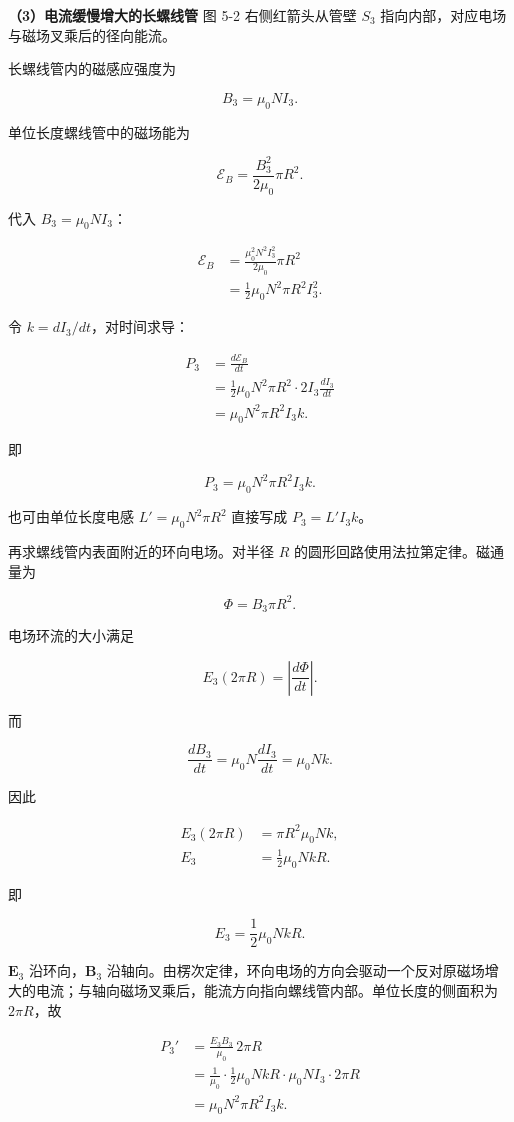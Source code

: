 \documentclass[12pt,a4paper,UTF8]{ctexart}
\begin{document}
\textbf{（3）电流缓慢增大的长螺线管} 图 5-2 右侧红箭头从管壁 \(S_3\)
指向内部，对应电场与磁场叉乘后的径向能流。

长螺线管内的磁感应强度为

\[\boxed{B_3=\mu_0NI_3}.\]

单位长度螺线管中的磁场能为

\[\mathcal E_B
=\frac{B_3^2}{2\mu_0}\pi R^2.\]

代入 \(B_3=\mu_0NI_3\)：

\[\begin{aligned}
\mathcal E_B
&=\frac{\mu_0^2N^2I_3^2}{2\mu_0}\pi R^2\\
&=\frac12\mu_0N^2\pi R^2I_3^2.
\end{aligned}\]

令 \(k=dI_3/dt\)，对时间求导：

\[\begin{aligned}
P_3
&=\frac{d\mathcal E_B}{dt}\\
&=\frac12\mu_0N^2\pi R^2\cdot2I_3\frac{dI_3}{dt}\\
&=\mu_0N^2\pi R^2I_3k.
\end{aligned}\]

即

\[\boxed{P_3=\mu_0N^2\pi R^2I_3k}.\]

也可由单位长度电感 \(L'=\mu_0N^2\pi R^2\) 直接写成 \(P_3=L'I_3k\)。

再求螺线管内表面附近的环向电场。对半径 \(R\)
的圆形回路使用法拉第定律。磁通量为

\[\Phi=B_3\pi R^2.\]

电场环流的大小满足

\[E_3(2\pi R)=\left|\frac{d\Phi}{dt}\right|.\]

而

\[\frac{dB_3}{dt}=\mu_0N\frac{dI_3}{dt}=\mu_0Nk.\]

因此

\[\begin{aligned}
E_3(2\pi R)
&=\pi R^2\mu_0Nk,\\
E_3
&=\frac12\mu_0NkR.
\end{aligned}\]

即

\[\boxed{E_3=\frac12\mu_0NkR}.\]

\(\bm E_3\) 沿环向，\(\bm B_3\)
沿轴向。由楞次定律，环向电场的方向会驱动一个反对原磁场增大的电流；与轴向磁场叉乘后，能流方向指向螺线管内部。单位长度的侧面积为
\(2\pi R\)，故

\[\begin{aligned}
P_3'
&=\frac{E_3B_3}{\mu_0}\,2\pi R\\
&=\frac1{\mu_0}
\cdot\frac12\mu_0NkR
\cdot\mu_0NI_3
\cdot2\pi R\\
&=\mu_0N^2\pi R^2I_3k.
\end{aligned}\]
\end{document}
